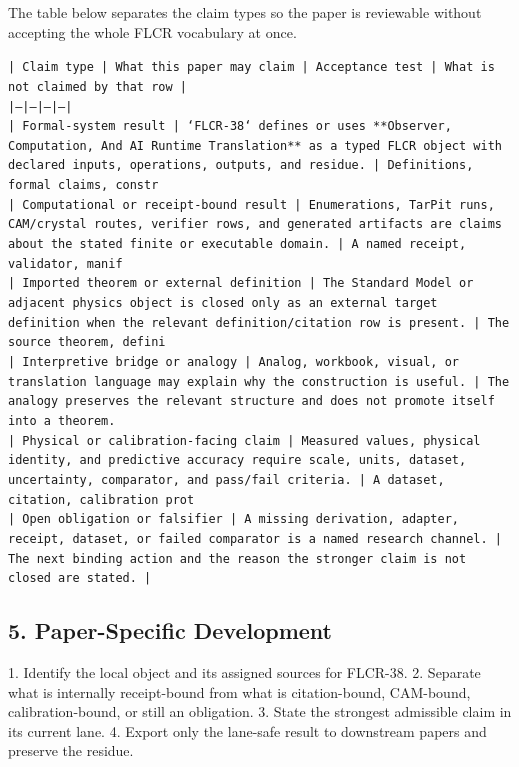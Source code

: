 \documentclass[11pt]{article}
\begin{document}
The table below separates the claim types so the paper is reviewable without accepting the whole FLCR vocabulary at once.

\noindent\texttt{| Claim type | What this paper may claim | Acceptance test | What is not claimed by that row |}\\
\noindent\texttt{|---|---|---|---|}\\
\noindent\texttt{| Formal-system result | `FLCR-38` defines or uses **Observer, Computation, And AI Runtime Translation** as a typed FLCR object with declared inputs, operations, outputs, and residue. | Definitions, formal claims, constr}\\
\noindent\texttt{| Computational or receipt-bound result | Enumerations, TarPit runs, CAM/crystal routes, verifier rows, and generated artifacts are claims about the stated finite or executable domain. | A named receipt, validator, manif}\\
\noindent\texttt{| Imported theorem or external definition | The Standard Model or adjacent physics object is closed only as an external target definition when the relevant definition/citation row is present. | The source theorem, defini}\\
\noindent\texttt{| Interpretive bridge or analogy | Analog, workbook, visual, or translation language may explain why the construction is useful. | The analogy preserves the relevant structure and does not promote itself into a theorem. }\\
\noindent\texttt{| Physical or calibration-facing claim | Measured values, physical identity, and predictive accuracy require scale, units, dataset, uncertainty, comparator, and pass/fail criteria. | A dataset, citation, calibration prot}\\
\noindent\texttt{| Open obligation or falsifier | A missing derivation, adapter, receipt, dataset, or failed comparator is a named research channel. | The next binding action and the reason the stronger claim is not closed are stated. | }\\

\subsection*{5. Paper-Specific Development}

1. Identify the local object and its assigned sources for FLCR-38.
2. Separate what is internally receipt-bound from what is citation-bound, CAM-bound, calibration-bound, or still an obligation.
3. State the strongest admissible claim in its current lane.
4. Export only the lane-safe result to downstream papers and preserve the residue.
\end{document}
